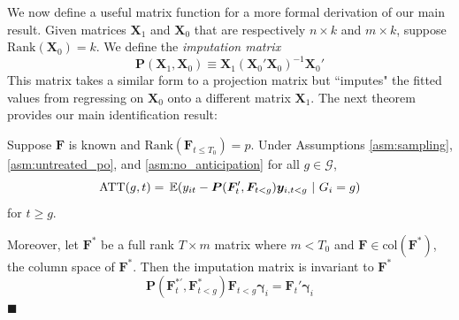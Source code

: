 \documentclass[12pt]{article}
\begin{document}
We now define a useful matrix function for a more formal derivation of our main result. Given matrices $\bm X_1$ and $\bm X_0$ that are respectively $n \times k$ and $m \times k$, suppose $\text{Rank}( \bm X_0) = k$. We define the \emph{imputation matrix} 
\begin{equation}
  \bm P(\bm X_1, \bm X_0) \equiv \bm X_1 (\bm X_0' \bm X_0)^{-1} \bm X_0'
\end{equation}
This matrix takes a similar form to a projection matrix but ``imputes" the fitted values from regressing on $\bm X_0$ onto a different matrix $\bm X_1$. The next theorem provides our main identification result:
\begin{theorem}\label{theorem:ATT_identification}
  Suppose $\bm{F}$ is known and $\text{Rank}(\bm{F}_{t \leq T_0}) = p$. Under Assumptions \ref{asm:sampling}, \ref{asm:untreated_po}, and \ref{asm:no_anticipation} for all $g \in \mathcal{G}$,
  \begin{equation}\label{eq:ATT_moments}
    \ATT(g,t) = \expec{y_{it} - \bm P(\bm{F}_{t}', \bm{F}_{t < g}) \bm y_{i,t < g}}{G_i = g}
  \end{equation}
  for $t \geq g$. 

  Moreover, let $\bm{F}^*$ be a full rank $T \times m$ matrix where $m < T_0$ and $\bm{F} \in \text{col}(\bm{F}^*)$, the column space of $\bm{F}^*$. Then the imputation matrix is invariant to $\bm{F}^*$
  \begin{equation}\label{eq:rotation_invariance}
    \bm P(\bm{F}_t^{*'}, \bm{F}^*_{t < g}) \bm{F}_{t < g} \bm \gamma_i = \bm{F}_t' \bm \gamma_i
  \end{equation}
  $\blacksquare$
\end{theorem}
\end{document}

